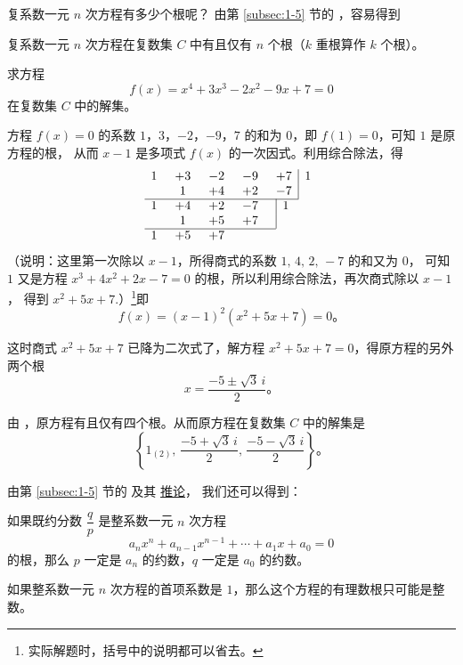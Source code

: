复系数一元 $n$ 次方程有多少个根呢？ 由第 \ref{subsec:1-5} 节的  ，容易得到


\begin{theorem} \label{theorem:yyncfc-2}
    复系数一元 $n$ 次方程在复数集 $C$ 中有且仅有 $n$ 个根（$k$ 重根算作 $k$ 个根）。
\end{theorem}


\liti 求方程
$$ f(x) = x^4 + 3x^3 - 2x^2 - 9x + 7 = 0 $$
在复数集 $C$ 中的解集。

\jie 方程 $f(x) = 0$ 的系数 $1$，$3$，$-2$，$-9$，$7$ 的和为 $0$，即 $f(1) = 0$，可知 $1$ 是原方程的根，
从而 $x - 1$ 是多项式 $f(x)$ 的一次因式。利用综合除法，得
$$
\begin{array}{*{4}{c@{\hspace{0.5cm}}}c|l}
    1 & +3 & -2 & -9 & +7 & 1 \\
      &  1 & +4 & +2 & -7 &  \\
    \cline{1-5}
    1 & +4 & +2 & -7 & \multicolumn{1}{|l}{ 1 } & \\
      &  1 & +5 & +7 & \multicolumn{1}{|l}{ }   & \\
    \cline{1-4}
    1 & +5 & +7
\end{array}
$$
（说明：这里第一次除以 $x - 1$，所得商式的系数 $1,\, 4,\, 2,\, -7$ 的和又为 $0$，
可知 $1$ 又是方程 $x^3 + 4x^2 + 2x - 7 = 0$ 的根，所以利用综合除法，再次商式除以 $x - 1$，
得到 $x^2 + 5x + 7$.）\footnote{实际解题时，括号中的说明都可以省去。}即
$$ f(x)  = (x - 1)^2 (x^2 + 5x + 7) = 0 \text{。} $$

这时商式 $x^2 + 5x + 7$ 已降为二次式了，解方程 $x^2 + 5x + 7 = 0$，得原方程的另外两个根
$$ x = \dfrac{-5 \pm \sqrt{3}\,i}{2} \text{。} $$

由 ，原方程有且仅有四个根。从而原方程在复数集 $C$ 中的解集是
$$ \left\{ 1_{(2)},\, \dfrac{-5 + \sqrt{3}\,i}{2},\, \dfrac{-5 - \sqrt{3}\,i}{2} \right\} \text{。} $$

由第 \ref{subsec:1-5} 节的  及其 \hyperref[corollary:dxs-2-1]{推论}，
我们还可以得到：

\begin{theorem} \label{theorem:yyncfc-3}
    如果既约分数 $\dfrac{q}{p}$ 是整系数一元 $n$ 次方程
    $$ a_n x^n + a_{n-1}x^{n-1} + \cdots + a_1x + a_0 = 0 $$
    的根，那么 $p$ 一定是 $a_n$ 的约数，$q$ 一定是 $a_0$ 的约数。
\end{theorem}

\begin{corollary} \label{corollary:yyncfc-3-1}
    如果整系数一元 $n$ 次方程的首项系数是 $1$，那么这个方程的有理数根只可能是整数。
\end{corollary}

